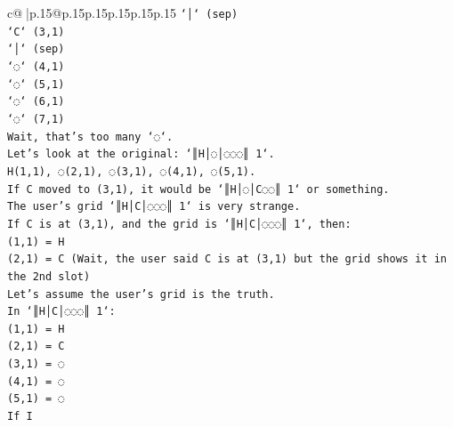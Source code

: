 \documentclass{article}
\begin{document}
{\begin{supertabular}{c@{$\;$}|p{.15\linewidth}@{}p{.15\linewidth}p{.15\linewidth}p{.15\linewidth}p{.15\linewidth}p{.15\linewidth}}
{{{\texttt{`│` (sep)} \\
\texttt{`C` (3,1)} \\
\texttt{`│` (sep)} \\
\texttt{`◌` (4,1)} \\
\texttt{`◌` (5,1)} \\
\texttt{`◌` (6,1)} \\
\texttt{`◌` (7,1)} \\
\texttt{Wait, that's too many `◌`.} \\
\texttt{Let's look at the original: `║H│◌│◌◌◌║ 1`.} \\
\texttt{H(1,1), ◌(2,1), ◌(3,1), ◌(4,1), ◌(5,1).} \\
\texttt{If C moved to (3,1), it would be `║H│◌│C◌◌║ 1` or something.} \\
\texttt{The user's grid `║H│C│◌◌◌║ 1` is very strange.} \\
\texttt{If C is at (3,1), and the grid is `║H│C│◌◌◌║ 1`, then:} \\
\texttt{(1,1) = H} \\
\texttt{(2,1) = C (Wait, the user said C is at (3,1) but the grid shows it in the 2nd slot)} \\
\texttt{Let's assume the user's grid is the truth.} \\
\texttt{In `║H│C│◌◌◌║ 1`:} \\
\texttt{(1,1) = H} \\
\texttt{(2,1) = C} \\
\texttt{(3,1) = ◌} \\
\texttt{(4,1) = ◌} \\
\texttt{(5,1) = ◌} \\
\texttt{If I} \\
            }
        }
    }
     \\ \\


\end{supertabular}}
\end{document}
